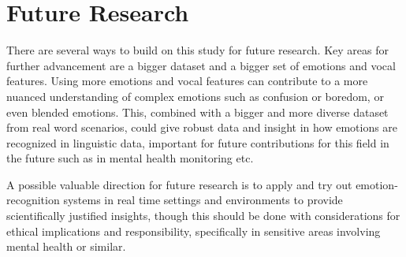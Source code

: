 \section{Future Research}
\label{sec:con-future}
There are several ways to build on this study for future research. 
Key areas for further advancement are a bigger dataset and a bigger set of emotions and vocal features. Using more emotions and vocal features can contribute to a more nuanced understanding of complex emotions such as confusion or boredom, or even blended emotions.
This, combined with a bigger and more diverse dataset from real word scenarios, could give robust data and insight in how emotions are recognized in linguistic data, important for future contributions for this field in the future such as in mental health monitoring etc.

A possible valuable direction for future research is to apply and try out emotion-recognition systems in real time settings and environments to provide scientifically justified insights, though this should be done with considerations for ethical implications and responsibility, specifically in sensitive areas involving mental health or similar.

